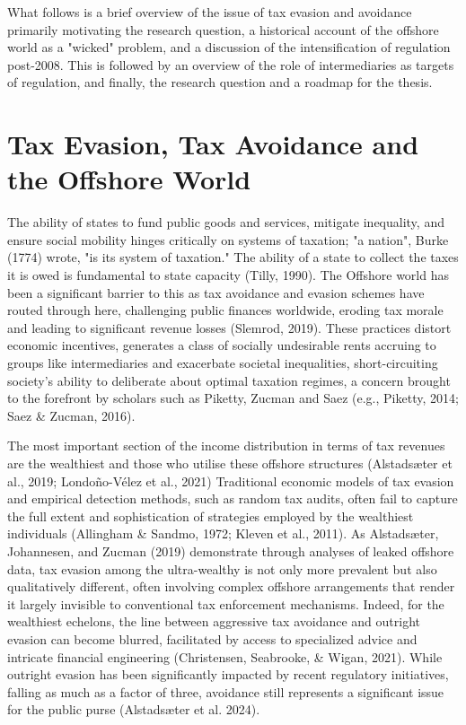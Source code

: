 What follows is a brief overview of the issue of tax evasion and avoidance primarily motivating the research question, a historical account of the offshore world as a "wicked" problem, and a discussion of the intensification of regulation post-2008. This is followed by an overview of the role of intermediaries as targets of regulation, and finally, the research question and a roadmap for the thesis.

\section{Tax Evasion, Tax Avoidance and the Offshore World}
\label{sec:1_1}

The ability of states to fund public goods and services, mitigate inequality, and ensure social mobility hinges critically on systems of taxation; "a nation", Burke (1774) wrote, "is its system of taxation." The ability of a state to collect the taxes it is owed is fundamental to state capacity (Tilly, 1990). The Offshore world has been a significant barrier to this as tax avoidance and evasion schemes have routed through here, challenging public finances worldwide, eroding tax morale and leading to significant revenue losses (Slemrod, 2019). These practices distort economic incentives, generates a class of socially undesirable rents accruing to groups like intermediaries and exacerbate societal inequalities, short-circuiting society's ability to deliberate about optimal taxation regimes, a concern brought to the forefront by scholars such as Piketty, Zucman and Saez (e.g., Piketty, 2014; Saez \& Zucman, 2016). 

The most important section of the income distribution in terms of tax revenues are the wealthiest and those who utilise these offshore structures (Alstadsæter et al., 2019; Londo{\~n}o-V{\'e}lez et al., 2021) Traditional economic models of tax evasion  and empirical detection methods, such as random tax audits, often fail to capture the full extent and sophistication of strategies employed by the wealthiest individuals (Allingham \& Sandmo, 1972; Kleven et al., 2011). As Alstadsæter, Johannesen, and Zucman (2019) demonstrate through analyses of leaked offshore data, tax evasion among the ultra-wealthy is not only more prevalent but also qualitatively different, often involving complex offshore arrangements that render it largely invisible to conventional tax enforcement mechanisms. Indeed, for the wealthiest echelons, the line between aggressive tax avoidance and outright evasion can become blurred, facilitated by access to specialized advice and intricate financial engineering (Christensen, Seabrooke, \& Wigan, 2021). While outright evasion has been significantly impacted by recent regulatory initiatives, falling as much as a factor of three, avoidance still represents a significant issue for the public purse (Alstadsæter et al. 2024).

